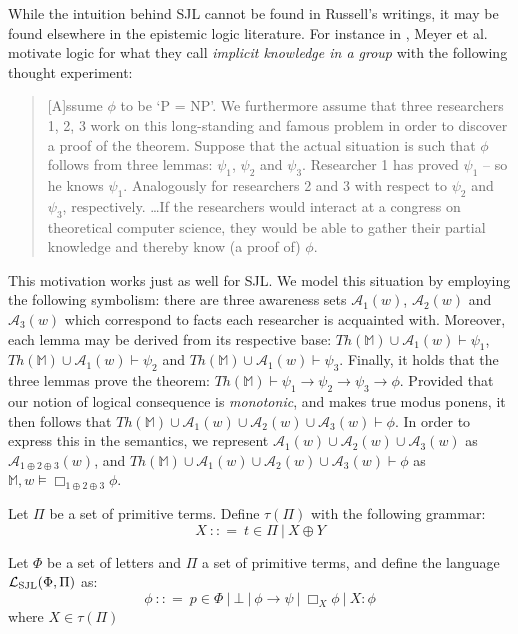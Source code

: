While the intuition behind SJL cannot be found in
Russell's writings, it may be found elsewhere in the epistemic logic
literature.  For instance in
\cite[pg. 67]{meyer_epistemic_1995}, Meyer et al. motivate logic for what they call
\emph{implicit knowledge in a group} with the following thought experiment:
\begin{quote}
[A]ssume $\phi$ to be `P = NP'. We furthermore assume that three
researchers 1, 2, 3 work on this long-standing and famous problem in
order to discover a proof of the theorem. Suppose that the actual
situation is such that $\phi$ follows from three lemmas: $\psi_1$,
$\psi_2$ and $\psi_3$. Researcher 1 has proved $\psi_1$ -- so he knows
$\psi_1$. Analogously for researchers 2 and 3 with respect to $\psi_2$
and $\psi_3$, respectively. \ldots If the researchers would interact
at a congress on theoretical computer science, they would be able to
gather their partial knowledge and thereby know (a proof of) $\phi$.
\end{quote}
This motivation works just as well for SJL. We model this situation by
employing the following symbolism:
there are three awareness sets $\mathcal{A}_1(w)$, $\mathcal{A}_2(w)$ and
$\mathcal{A}_3(w)$ which correspond to facts each researcher is
acquainted with.  Moreover, each lemma may be derived from its
respective base: $Th(\mathbb{M}) \cup \mathcal{A}_1(w) \vdash
\psi_1$, $Th(\mathbb{M}) \cup \mathcal{A}_1(w) \vdash
\psi_2$ and $Th(\mathbb{M}) \cup \mathcal{A}_1(w) \vdash
\psi_3$.  Finally, it holds that the three lemmas prove the theorem:
$Th(\mathbb{M}) \vdash \psi_1 \to \psi_2 \to \psi_3 \to \phi$.
Provided that our notion of logical consequence is \emph{monotonic},
and makes true modus ponens, it then follows that
$Th(\mathbb{M}) \cup \mathcal{A}_1(w) \cup \mathcal{A}_2(w) \cup
\mathcal{A}_3(w) \vdash \phi$.  In order to express this in the semantics, we represent $\mathcal{A}_1(w) \cup \mathcal{A}_2(w) \cup
\mathcal{A}_3(w)$ as $\mathcal{A}_{1 \oplus 2 \oplus 3}(w)$, and
$Th(\mathbb{M}) \cup \mathcal{A}_1(w) \cup \mathcal{A}_2(w) \cup
\mathcal{A}_3(w) \vdash \phi$ as $\mathbb{M}, w \models \Box_{1 \oplus 2 \oplus 3} \phi$.

\begin{definition}
  Let $\Pi$ be a set of primitive terms.  Define $\tau (\Pi)$ with the
  following grammar:
  \[ X \  : : = \  t \in \Pi \  | \  X  \oplus Y \]
  
  Let $\Phi$ be a set of letters and $\Pi$ a set of primitive terms, and
  define the language $\mathcal{L}_{\operatorname{SJL}} (\Phi, \Pi)$ as:
  \[ \phi \  : : = \  p \in \Phi \  | \  \bot
     \  | \  \phi \rightarrow \psi \  |
     \  \Box_X \phi \  | \  X : \phi \]
  where $X \in \tau (\Pi)$
\end{definition}

